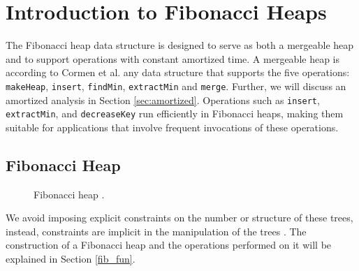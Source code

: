\documentclass{clmthesis}
\begin{document}
\chapter{Introduction to Fibonacci Heaps}\label{prel_fibonacci}
The Fibonacci heap data structure is designed to serve as both a mergeable heap and to support operations with constant amortized time. A mergeable heap is according to Cormen et al. \cite{thomas2022} any data structure that supports the five operations: \texttt{makeHeap}, \texttt{insert}, \texttt{findMin}, \texttt{extractMin} and \texttt{merge}. Further, we will discuss an amortized analysis in Section \ref{sec:amortized}. Operations such as \texttt{insert}, \texttt{extractMin}, and \texttt{decreaseKey} run efficiently in Fibonacci heaps, making them suitable for applications that involve frequent invocations of these operations. 

\section{Fibonacci Heap}

\begin{figure}[h]
	\centering
	\caption{Fibonacci heap \cite{thomas2022}.}
	\label{fig:exfib}
\end{figure}

We avoid imposing explicit constraints on the number or structure of these trees, instead, constraints are implicit in the manipulation of the trees \cite{fredman1987fibonacci}. The construction of a Fibonacci heap and the operations performed on it will be explained in Section \ref{fib_fun}. 
\end{document}

